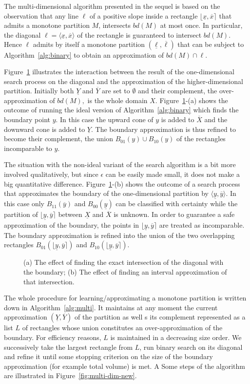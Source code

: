 \documentclass{llncs}%
\newcommand{\eps}{\epsilon}
\newcommand{\ul}[1]{{\underline{#1}}}
\renewcommand{\ov}[1]{{\overline{#1}}}
\newcommand{\uX}{\ul{X}}
\newcommand{\oX}{\ov{X}}
\newcommand{\uY}{\ul{Y}}
\newcommand{\oY}{\ov{Y}}
\newcommand{\ux}{\ul{x}}
\newcommand{\ox}{\ov{x}}
\newcommand{\uy}{\ul{y}}
\newcommand{\oy}{\ov{y}}
\newcommand{\ull}{\ul{\ell}}
\newcommand{\oll}{\ov{\ell}}
\newcommand{\bx}[2]{{\lfloor #1,#2\rceil}}
\newcommand{\diag}[2]{{\langle #1,#2\rangle}}
\begin{document}
The multi-dimensional algorithm presented in the sequel is based on the observation that any line $\ell$ of a positive slope  inside a rectangle $\bx{\ux}{\ox}$ that admits a monotone partition $M$, intersects $bd(M)$ at most once. In particular, the diagonal $\ell=\diag{\ux}{\ox}$ of the rectangle  is guaranteed to intersect $bd(M)$. Hence $\ell$ admits by itself a monotone partition $(\ull,\oll)$ that can be subject to Algorithm~\ref{alg:binary} to obtain an approximation of $bd(M)\cap \ell$.

Figure~\ref{fig:ideal-not} illustrates the interaction between the result of the one-dimensional search process on the diagonal and the approximation of the higher-dimensional partition. Initially both $\uY$ and $\oY$ are set to $\emptyset$ and their complement, the over-approximation of $bd(M),$ is the whole domain $X$. Figure~\ref{fig:ideal-not}-(a) shows the outcome of running the ideal version of Algorithm~\ref{alg:binary} which finds the boundary point $y$. In this case the upward cone of $y$ is added to $\oX$ and the downward cone is added to $\uY$. The boundary approximation is thus refined to become their complement, the union $B_{01}(y)\cup B_{10}(y)$ of the rectangles incomparable to $y$.

The situation with the non-ideal variant of the search algorithm is a bit more involved qualitatively, but since $\eps$ can be easily made small, it does not make a big quantitative difference. Figure~\ref{fig:ideal-not}-(b) shows the outcome of a search process that approximates the boundary of the one-dimensional partition by $\diag{\uy}{\oy}$. In this case only $B_{11}(\oy)$ and  $B_{00}(\uy)$ can be classified with certainty while the partition of $\bx{\uy}{\oy}$ between $\uX$ and $\oX$ is unknown. In order to guarantee a safe approximation of the boundary, the points in $\bx{\uy}{\oy}$ are treated as incomparable. The boundary approximation is refined into  the union of the two overlapping rectangles $B_{01}(\bx{\uy}{\oy})$ and $B_{10}(\bx{\uy}{\oy})$. %

\begin{figure}
  \centering

  \caption{(a) The effect of finding the exact intersection of the diagonal with the boundary; (b) The effect of finding an interval approximation of that intersection.}\label{fig:ideal-not}
\end{figure}

The whole procedure for learning/approximating a monotone partition is written down in Algorithm~\ref{alg:multi}. It maintains at any moment the current approximation $(\uY,\oY)$ of the partition as well s its complement represented as a list $L$ of rectangles whose union constitutes an over-approximation of the boundary. For efficiency reasons, $L$ is maintained in a decreasing size order. We successively take the largest rectangle from $L$, run binary search on its diagonal and refine it until some stopping criterion on the size of the boundary approximation  (for example total volume) is met. A Some steps of the algorithm are illustrated in Figure~\ref{fig:multi-dim-new}.
\end{document}
